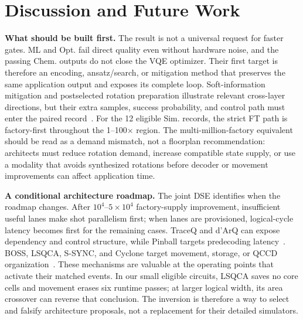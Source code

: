 \section{Discussion and Future Work}

\noindent\textbf{What should be built first.}
The result is not a universal request for faster gates. ML and Opt. fail direct quality even without hardware noise, and the passing Chem. outputs do not close the VQE optimizer. Their first target is therefore an encoding, ansatz/search, or mitigation method that preserves the same application output and exposes its complete loop. Soft-information mitigation and postselected rotation preparation illustrate relevant cross-layer directions, but their extra samples, success probability, and control path must enter the paired record~\cite{zhou2025softqem,choi2023postselectedrotation}. For the 12 eligible Sim. records, the strict FT path is factory-first throughout the 1--100$\times$ region. The multi-million-factory equivalent should be read as a demand mismatch, not a floorplan recommendation: architects must reduce rotation demand, increase compatible state supply, or use a modality that avoids synthesized rotations before decoder or movement improvements can affect application time.

\noindent\textbf{A conditional architecture roadmap.}
The joint DSE identifies when the roadmap changes. After $10^4$--$5\times10^4$ factory-supply improvement, insufficient useful lanes make shot parallelism first; when lanes are provisioned, logical-cycle latency becomes first for the remaining cases. TraceQ and d'ArQ can expose dependency and control structure, while Pinball targets predecoding latency~\cite{traceq2026,darq2026,pinball2026}. BOSS, LSQCA, S-SYNC, and Cyclone target movement, storage, or QCCD organization~\cite{boss2025,lsqca2025,ssync2025,cyclone2026}. These mechanisms are valuable at the operating points that activate their matched events. In our small eligible circuits, LSQCA saves no core cells and movement erases six runtime passes; at larger logical width, its area crossover can reverse that conclusion. The inversion is therefore a way to select and falsify architecture proposals, not a replacement for their detailed simulators.

